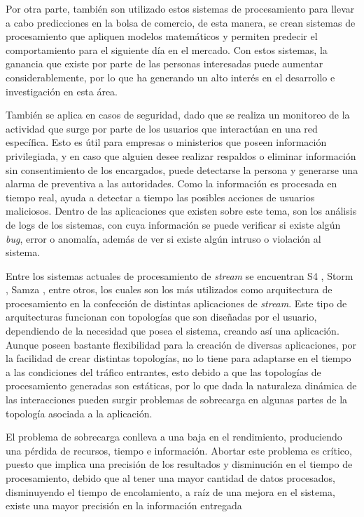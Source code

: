 Por otra parte, también son utilizado estos sistemas de procesamiento para llevar a cabo predicciones en la bolsa de comercio, de esta manera, se crean sistemas de procesamiento que apliquen modelos matemáticos y permiten predecir el comportamiento para el siguiente día en el mercado. Con estos sistemas, la ganancia que existe por parte de las personas interesadas puede aumentar considerablemente, por lo que ha generando un alto interés en el desarrollo e investigación en esta área.

También se aplica en casos de seguridad, dado que se realiza un monitoreo de la actividad que surge por parte de los usuarios que interactúan en una red específica. Esto es útil para empresas o ministerios que poseen información privilegiada, y en caso que alguien desee realizar respaldos o eliminar información sin consentimiento de los encargados, puede detectarse la persona y generarse una alarma de preventiva a las autoridades. Como la información es procesada en tiempo real, ayuda a detectar a tiempo las posibles acciones de usuarios maliciosos. Dentro de las aplicaciones que existen sobre este tema, son los análisis de logs de los sistemas, con cuya información se puede verificar si existe algún \textit{bug}, error o anomalía, además de ver si existe algún intruso o violación al sistema.

Entre los sistemas actuales de procesamiento de \textsl{stream} se encuentran S4 \citep{s4yahoo}, Storm \citep{stormtwitter}, Samza \citep{samza}, entre otros, los cuales son los más utilizados como arquitectura de procesamiento en la confección de distintas aplicaciones de \textsl{stream}. Este tipo de arquitecturas funcionan con topologías que son diseñadas por el usuario, dependiendo de la necesidad que posea el sistema, creando así una aplicación. Aunque poseen bastante flexibilidad para la creación de diversas aplicaciones, por la facilidad de crear distintas topologías, no lo tiene para adaptarse en el tiempo a las condiciones del tráfico entrantes, esto debido a que las topolog\'ias de procesamiento generadas son est\'aticas, por lo que dada la naturaleza din\'amica de las interacciones pueden surgir problemas de sobrecarga en algunas partes de la topología asociada a la aplicación.

El problema de sobrecarga conlleva a una baja en el rendimiento, produciendo una pérdida de recursos, tiempo e información. Abortar este problema es crítico, puesto que implica una precisión de los resultados y disminución en el tiempo de procesamiento, debido que al tener una mayor cantidad de datos procesados, disminuyendo el tiempo de encolamiento, a raíz de una mejora en el sistema, existe una mayor precisión en la información entregada

